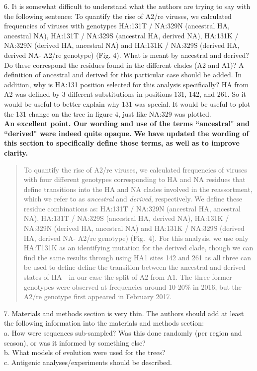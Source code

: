 \documentclass[11pt,oneside,letterpaper]{article}
\begin{document}
6. It is somewhat difficult to understand what the authors are trying to say with the following sentence: To quantify the rise of A2/re viruses, we calculated frequencies of viruses with genotypes HA:131T / NA:329N (ancestral HA, ancestral NA), HA:131T / NA:329S (ancestral HA, derived NA), HA:131K / NA:329N (derived HA, ancestral NA) and HA:131K / NA:329S (derived HA, derived NA- A2/re genotype) (Fig. 4). What is meant by ancestral and derived? Do these correspond the residues found in the different clades (A2 and A1)? A definition of ancestral and derived for this particular case should be added. In addition, why is HA:131 position selected for this analysis specifically? HA from A2 was defined by 3 different substitutions in positions 131, 142, and 261. So it would be useful to better explain why 131 was special. It would be useful to plot the 131 change on the tree in figure 4, just like NA:329 was plotted.\\

\textbf{An excellent point. Our wording and use of the terms ``ancestral" and ``derived" were indeed quite opaque. We have updated the wording of this section to specifically define those terms, as well as to improve clarity.}

\begin{quotation}
  To quantify the rise of A2/re viruses, we calculated frequencies of viruses with four different genotypes corresponding to HA and NA residues that define transitions into the HA and NA clades involved in the reassortment, which we refer to as \textit{ancestral} and \textit{derived}, respectively.
  We define these residue combinations as: HA:131T / NA:329N (ancestral HA, ancestral NA), HA:131T / NA:329S (ancestral HA, derived NA), HA:131K / NA:329N (derived HA, ancestral NA) and HA:131K / NA:329S (derived HA, derived NA- A2/re genotype) (Fig.~4).
  For this analysis, we use only HA:T131K as an identifying mutation for the derived clade, though we can find the same results through using HA1 sites 142 and 261 as all three can be used to define define the transition between the ancestral and derived states of HA---in our case the split of A2 from A1.
  The three former genotypes were observed at frequencies around 10-20\% in 2016, but the A2/re genotype first appeared in February 2017.
\end{quotation}

7. Materials and methods section is very thin. The authors should add at least the following information into the materials and methods section: \\
a.      How were sequences sub-sampled? Was this done randomly (per region and season), or was it informed by something else?\\
b.      What models of evolution were used for the trees?\\
c.      Antigenic analyses/experiments should be described.\\
\end{document}

